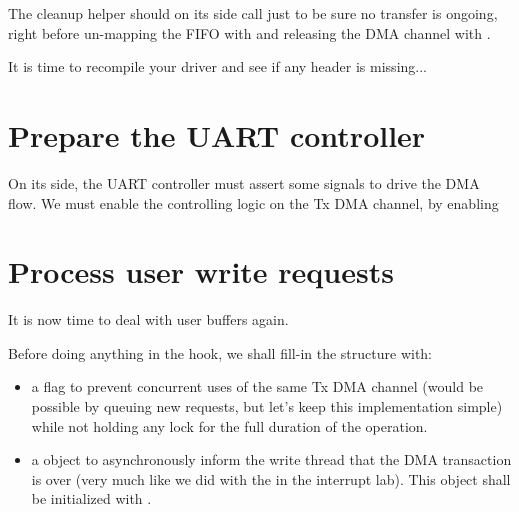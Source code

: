 The cleanup helper should on its side call
 just to be sure no transfer is
ongoing, right before un-mapping the FIFO with  and
releasing the DMA channel with .

It is time to recompile your driver and see if any header is missing...

\section{Prepare the UART controller}

On its side, the UART controller must assert some signals to drive the DMA
flow. We must enable the controlling logic on the Tx DMA channel, by enabling
\if{}\fi

\section{Process user write requests}

It is now time to deal with user buffers again.

Before doing anything in the  hook, we shall fill-in the
 structure with:
\begin{itemize}
\item a  flag to prevent concurrent uses of the same
  Tx DMA channel (would be possible by queuing new requests, but let's keep this
  implementation simple) while not holding any lock for the full duration of
  the operation.
\item a  object to asynchronously inform the
  write thread that the DMA transaction is over (very much like we did with the
   in the interrupt lab). This object shall be initialized with
  .
\end{itemize}


